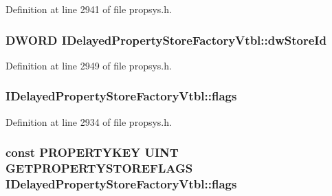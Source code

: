 Definition at line 2941 of file propsys.\+h.

\subsubsection[{\texorpdfstring{dw\+Store\+Id}{dwStoreId}}]{ {\bf D\+W\+O\+RD} I\+Delayed\+Property\+Store\+Factory\+Vtbl\+::dw\+Store\+Id}\hypertarget{struct_i_delayed_property_store_factory_vtbl_abdaa9e5ec5dc24bb88e061d16445b003}{}\label{struct_i_delayed_property_store_factory_vtbl_abdaa9e5ec5dc24bb88e061d16445b003}


Definition at line 2949 of file propsys.\+h.

\subsubsection[{\texorpdfstring{flags}{flags}}]{ I\+Delayed\+Property\+Store\+Factory\+Vtbl\+::flags}\hypertarget{struct_i_delayed_property_store_factory_vtbl_a31e3ba42f498de90fd0a9b1a5e335924}{}\label{struct_i_delayed_property_store_factory_vtbl_a31e3ba42f498de90fd0a9b1a5e335924}


Definition at line 2934 of file propsys.\+h.

\subsubsection[{\texorpdfstring{flags}{flags}}]{ {\bf const} {\bf P\+R\+O\+P\+E\+R\+T\+Y\+K\+EY} {\bf U\+I\+NT} {\bf G\+E\+T\+P\+R\+O\+P\+E\+R\+T\+Y\+S\+T\+O\+R\+E\+F\+L\+A\+GS} I\+Delayed\+Property\+Store\+Factory\+Vtbl\+::flags}\hypertarget{struct_i_delayed_property_store_factory_vtbl_a6e01f7d52d362d2d05aba0ea2a0b92e0}{}\label{struct_i_delayed_property_store_factory_vtbl_a6e01f7d52d362d2d05aba0ea2a0b92e0}


